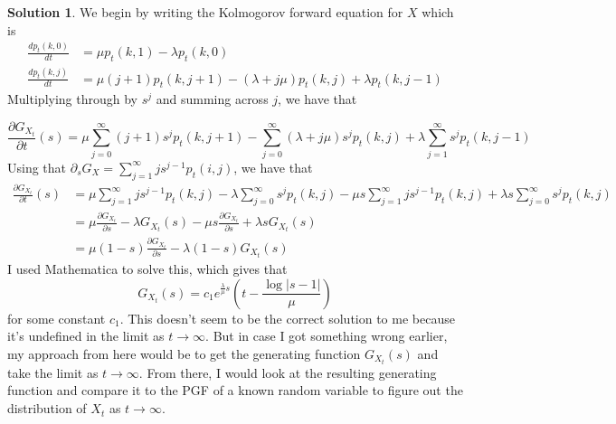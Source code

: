 \documentclass[12pt]{article}
\newcommand{\abs}[1]{ \left| #1 \right| }
\theoremstyle{definition}
\newtheorem{sol}{Solution}
\theoremstyle{remark}
\begin{document}
\begin{sol}
    We begin by writing the Kolmogorov forward equation for $X$ which is
    \begin{align*}
        \frac{dp_{t}(k, 0)}{dt} &= \mu p_{t}(k,1) - \lambda p_{t}(k,0) \\
        \frac{dp_{t}(k, j)}{dt} &= \mu(j+1) p_{t}(k,j+1) -(\lambda + j\mu) p_{t}(k,j) + \lambda p_{t}(k,j-1)
    \end{align*}
    Multiplying through by $s^{j}$ and summing across $j$, we have that

    \begin{equation*}
        \frac{\partial G_{X_{t}}}{\partial t}(s) 
        = 
        \mu \sum_{j=0}^{\infty} (j+1) s^{j} p_{t}(k,j+1) 
        - \sum_{j=0}^{\infty} (\lambda + j\mu)s^{j} p_{t}(k,j) 
        + \lambda \sum_{j=1}^{\infty} s^{j} p_{t}(k,j-1)
    \end{equation*}
    Using that $\partial_{s} G_{X} = \sum_{j=1}^{\infty} j s^{j-1} p_{t}(i,j)$, we have that
    \begin{align*}
            \frac{\partial G_{X_{t}}}{\partial t}(s) 
            &= \mu \sum_{j=1}^{\infty} j s^{j-1} p_{t}(k, j)
            - \lambda \sum_{j=0}^{\infty} s^{j} p_{t}(k,j)
            - \mu s \sum_{j=1}^{\infty} j s^{j-1} p_{t}(k,j)
            + \lambda s \sum_{j=0}^{\infty} s^{j} p_{t}(k,j)\\
            &= \mu \frac{\partial G_{X_{t}}}{\partial s}
            - \lambda G_{X_{t}}(s)
            - \mu s \frac{\partial G_{X_{t}}}{\partial s}
            + \lambda s G_{X_{t}}(s)\\
            &= \mu(1-s) \frac{\partial G_{X_{t}}}{\partial s} - \lambda(1-s) G_{X_{t}}(s)
    \end{align*}
    I used Mathematica to solve this, which gives that
    \begin{equation*}
        G_{X_{t}}(s) = c_{1} e^{\frac{\lambda}{\mu} s}(t-  \frac{\log\abs{s-1}}{\mu}) 
    \end{equation*}
    for some constant $c_{1}$. This doesn't seem to be the correct solution to me because it's undefined in the limit as $t\to \infty$. But in case I got something wrong earlier, my approach from here would be to get the generating function $G_{X_{t}}(s)$ and take the limit as $t\to \infty$. From there, I would look at the resulting generating function and compare it to the PGF of a known random variable to figure out the distribution of $X_{t}$ as $t\to \infty$. 
\end{sol}
\end{document}
